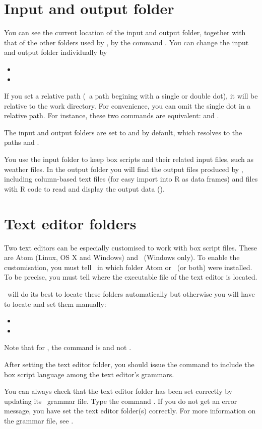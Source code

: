 \section{Input and output folder}
You can see the current location of the input and output folder, together with that of the other folders used by \US, by the command . You can change the input and output folder individually by
\begin{itemize}
\item {}
\item {}
\end{itemize}

If you set a relative path (\ie\ a path begining with a single or double dot), it will be relative to the work directory. For convenience, you can omit the single dot in a relative path. For instance, these two commands are equivalent:  and .

The input and output folders are set to  and  by default, which resolves to the paths  and .

You use the input folder to keep box scripts and their related input files, such as weather files. In the output folder you will find the output files produced by \US, including column-based text files (for easy import into R as data frames) and files with R code to read and display the output data ().

\section{Text editor folders}
Two text editors can be especially customised to work with box script files. These are Atom (Linux, OS X and Windows) and \NPP\ (Windows only). To enable the customisation, you must tell \US\ in which folder Atom or \NPP\ (or both) were installed. To be precise, you must tell where the executable file of the text editor is located.

\US\ will do its best to locate these folders automatically but otherwise you will have to locate and set them manually:
\begin{itemize}
\item {}
\item {}
\end{itemize}
Note that for \NPP, the command is  and not . 

After setting the text editor folder, you should issue the  command to include the box script language among the text editor's grammars.

You can always check that the text editor folder has been set correctly by updating its \US\ grammar file. Type the command . If you do not get an error message, you have set the text editor folder(s) correctly. For more information on the grammar file, see .
